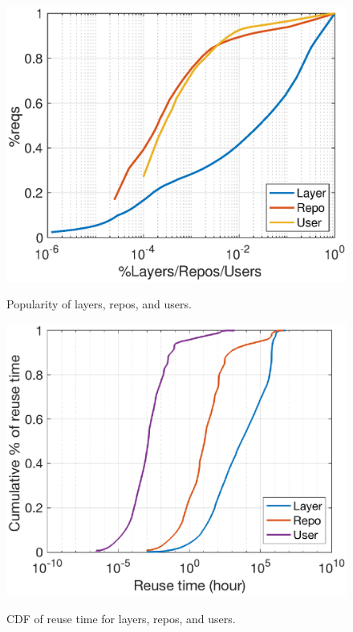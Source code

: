\begin{figure}[t]
	\centering
		\begin{minipage}{0.225\textwidth}
			\centering
			\includegraphics[width=1\textwidth]{graphs/skewness_cdf.eps}
			\caption{Popularity of layers, repos, and users.}
			\label{fig:sknewss}
		\end{minipage}
	\begin{minipage}{0.225\textwidth}
		\centering
		\includegraphics[width=1\textwidth]{graphs/reuse_time.eps}
		\caption{CDF of reuse time for layers, repos, and users.}
		\vspace{-3pt}
		\label{fig:reusetime}
	\end{minipage}
\end{figure}